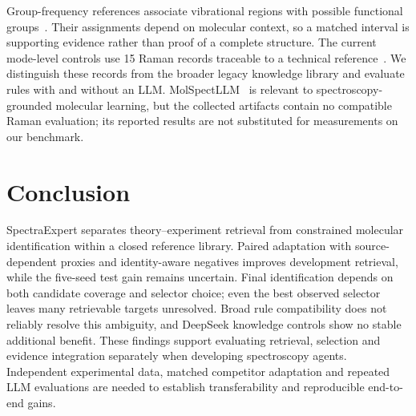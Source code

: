\documentclass[conference]{IEEEtran}
\begin{document}
Group-frequency references associate vibrational regions with possible functional groups~\cite{socrates2004infrared,nakamoto2008infrared}. Their assignments depend on molecular context, so a matched interval is supporting evidence rather than proof of a complete structure. The current mode-level controls use 15 Raman records traceable to a technical reference~\cite{horibaRATN18}. We distinguish these records from the broader legacy knowledge library and evaluate rules with and without an LLM. MolSpectLLM~\cite{shen2025specmol} is relevant to spectroscopy-grounded molecular learning, but the collected artifacts contain no compatible Raman evaluation; its reported results are not substituted for measurements on our benchmark.





\section{Conclusion}
SpectraExpert separates theory--experiment retrieval from constrained molecular identification within a closed reference library. Paired adaptation with source-dependent proxies and identity-aware negatives improves development retrieval, while the five-seed test gain remains uncertain. Final identification depends on both candidate coverage and selector choice; even the best observed selector leaves many retrievable targets unresolved. Broad rule compatibility does not reliably resolve this ambiguity, and DeepSeek knowledge controls show no stable additional benefit. These findings support evaluating retrieval, selection and evidence integration separately when developing spectroscopy agents. Independent experimental data, matched competitor adaptation and repeated LLM evaluations are needed to establish transferability and reproducible end-to-end gains.

\IEEEtriggercmd{\balance}


\end{document}
